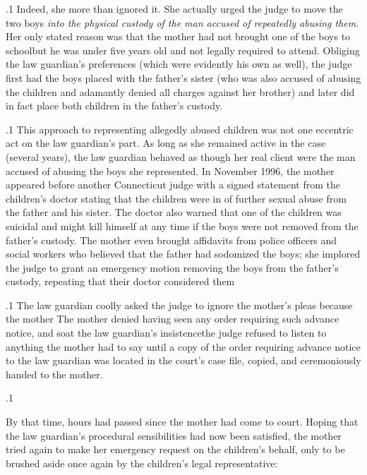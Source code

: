 \documentclass[11pt, twoside]{article}
\begin{document}
{\p.1{%
Indeed, she more than ignored it. She actually urged the judge to
move the two boys \textit{into the physical custody of
the man accused of repeatedly abusing them}. Her only stated reason was that the mother had
not brought one of the boys to school\mdash{}but he was under five years old
and not legally required to attend. Obliging the law guardian’s preferences (which were evidently his own as well), the judge first had the
boys placed with the father’s sister (who was also accused of abusing the
children and adamantly denied all charges against her brother) and later
did in fact place both children in the father’s custody.
}%

\p.1{%
This approach to representing allegedly abused children was not one
eccentric act on the law guardian’s part. As long as she remained active
in the case (several years), the law guardian behaved as though her
real client were the man accused of abusing the boys she represented.
In November 1996, the mother appeared before another Connecticut
judge with a signed statement from the children’s doctor stating that
the children were in  of further sexual abuse from
the father and his sister. The doctor also warned that one of the children was suicidal and might kill himself at any time if the boys were not
removed from the father’s custody. The mother even brought affidavits
from police officers and social workers who believed that the father had
sodomized the boys; she implored the judge to grant an emergency motion removing the boys from the father’s custody, repeating that their
doctor considered them 
}%

\p.1{%
The law guardian coolly asked the judge to ignore the mother’s pleas
because the mother  The mother denied
having seen any order requiring such advance notice, and so\mdash{}at the law
guardian’s insistence\mdash{}the judge refused to listen to anything the mother
had to say until a copy of the order requiring advance notice to the law
guardian was located in the court’s case file, copied, and ceremoniously
handed to the mother.
}%

\p.1{%
By that time, hours had passed since the mother had come to court.
Hoping that the law guardian’s procedural sensibilities had now been
satisfied, the mother tried again to make her emergency request on the
children’s behalf, only to be brushed aside once again by the children’s
legal representative:

}}
\end{document}
